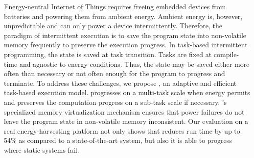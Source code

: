 Energy-neutral Internet of Things requires freeing embedded devices from batteries and powering them from ambient energy. Ambient energy is, however, unpredictable and can only power a device intermittently. Therefore, the paradigm of intermittent execution is to save the program state into non-volatile memory frequently to preserve the execution progress. In task-based intermittent programming, the state is saved at task transition. Tasks are fixed at compile-time and agnostic to energy conditions. Thus, the state may be saved either more often than necessary or not often enough for the program to progress and terminate. To address these challenges, we propose \sys, an adaptive and efficient task-based execution model. \sys progresses on a multi-task scale when energy permits and preserves the computation progress on a sub-task scale if necessary. \sys's specialized memory virtualization mechanism ensures that power failures do not leave the program state in non-volatile memory inconsistent. Our evaluation on a real energy-harvesting platform not only shows that \sys reduces run time by up to 54\% as compared to a state-of-the-art system, but also it is able to progress where static systems fail.